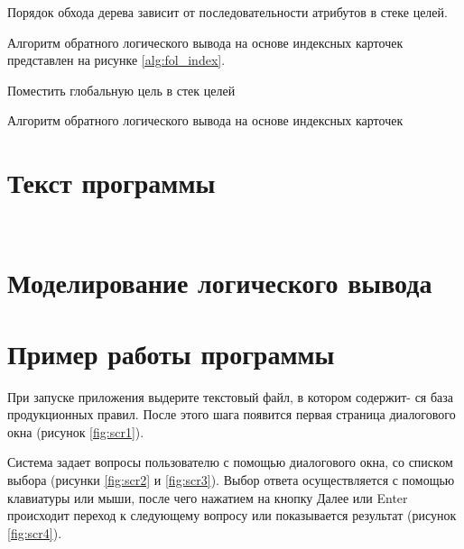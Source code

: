 Порядок обхода дерева зависит от последовательности атрибутов в стеке целей.

Алгоритм обратного логического вывода на основе индексных карточек представлен на рисунке \ref{alg:fol_index}.

\begin{algorithm}[H]
Поместить глобальную цель в стек целей\;
\caption{Алгоритм обратного логического вывода на основе индексных карточек} \label{alg:fol_index}
\end{algorithm}

\section{Текст программы}

\inputminted{c++}{src/logic.h}

\inputminted[firsthline=104,lastline=240]{c++}{src/logic.h}

\section{Моделирование логического вывода}



\section{Пример работы программы}

При запуске приложения выдерите текстовый файл, в котором содержит-
ся база продукционных правил. После этого шага появится первая страница
диалогового окна (рисунок \ref{fig:scr1}).


Система задает вопросы пользователю с помощью диалогового окна, со
списком выбора (рисунки \ref{fig:scr2} и \ref{fig:scr3}). Выбор ответа осуществляется с
помощью клавиатуры или мыши, после чего нажатием на кнопку Далее или
Enter происходит переход к следующему вопросу или показывается результат
(рисунок \ref{fig:scr4}).